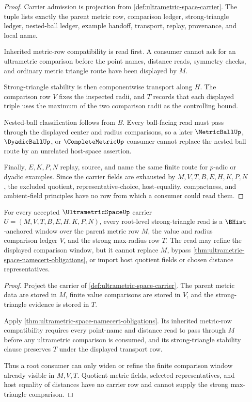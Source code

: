 \begin{proof}
Carrier admission is projection from \autoref{def:ultrametric-space-carrier}. The tuple lists exactly the parent metric row, comparison ledger, strong-triangle ledger, nested-ball ledger, example handoff, transport, replay, provenance, and local name.

Inherited metric-row compatibility is read first. A consumer cannot ask for an ultrametric comparison before the point names, distance reads, symmetry checks, and ordinary metric triangle route have been displayed by $M$.

Strong-triangle stability is then componentwise transport along $H$. The comparison row $V$ fixes the inspected radii, and $T$ records that each displayed triple uses the maximum of the two comparison radii as the controlling bound.

Nested-ball classification follows from $B$. Every ball-facing read must pass through the displayed center and radius comparisons, so a later $\MetricBallUp$, $\DyadicBallUp$, or $\CompleteMetricUp$ consumer cannot replace the nested-ball route by an unrelated host-space assertion.

Finally, $E,K,P,N$ replay, source, and name the same finite route for $p$-adic or dyadic examples. Since the carrier fields are exhausted by $M,V,T,B,E,H,K,P,N$, the excluded quotient, representative-choice, host-equality, compactness, and ambient-field principles have no row from which a consumer could read them.
\end{proof}

\begin{theorem}
\label{thm:ultrametric-space-root-strong-triangle-window}
For every accepted $\UltrametricSpaceUp$ carrier $U=(M,V,T,B,E,H,K,P,N)$, every root-level strong-triangle read is a $\BHist$-anchored window over the parent metric row $M$, the value and radius comparison ledger $V$, and the strong max-radius row $T$. The read may refine the displayed comparison window, but it cannot replace $M$, bypass \autoref{thm:ultrametric-space-namecert-obligations}, or import host quotient fields or chosen distance representatives.
\end{theorem}
\begin{proof}
Project the carrier of \autoref{def:ultrametric-space-carrier}. The parent metric data are stored in $M$, finite value comparisons are stored in $V$, and the strong-triangle evidence is stored in $T$.

Apply \autoref{thm:ultrametric-space-namecert-obligations}. Its inherited metric-row compatibility requires every point-name and distance read to pass through $M$ before any ultrametric comparison is consumed, and its strong-triangle stability clause preserves $T$ under the displayed transport row.

Thus a root consumer can only widen or refine the finite comparison window already visible in $M,V,T$. Quotient metric fields, selected representatives, and host equality of distances have no carrier row and cannot supply the strong max-triangle comparison.
\end{proof}

